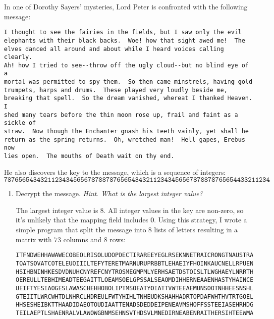 
\begin{problem}
In one of Dorothy Sayers' mysteries, Lord Peter is confronted with the following message:

\vspace{1ex}

\begin{verbatim}
I thought to see the fairies in the fields, but I saw only the evil
elephants with their black backs.  Woe! how that sight awed me!  The
elves danced all around and about while I heard voices calling clearly.
Ah! how I tried to see--throw off the ugly cloud--but no blind eye of a
mortal was permitted to spy them.  So then came minstrels, having gold
trumpets, harps and drums.  These played very loudly beside me,
breaking that spell.  So the dream vanished, whereat I thanked Heaven.  I
shed many tears before the thin moon rose up, frail and faint as a sickle of
straw.  Now though the Enchanter gnash his teeth vainly, yet shall he
return as the spring returns.  Oh, wretched man!  Hell gapes, Erebus now
lies open.  The mouths of Death wait on thy end.
\end{verbatim}
\vspace{1ex}

He also discovers the key to the message, which is a sequence of integers:
\[ 
\texttt{7876565434321123434565678788787656543432112343456567878878765654433211234}
\]

\begin{enumerate}\renewcommand{\itemsep}{3mm}
\item Decrypt the message. \emph{Hint. What is the largest integer value?}

\begin{Answer}
The largest integer value is $8$.
All integer values in the key are non-zero, so it's unlikely that the mapping field includes 0.
Using this strategy, I wrote a simple program that split the message into 8 lists of letters
resulting in a matrix with $73$ columns and $8$ rows: 

{
\color{blue}%
\begin{verbatim}
ITFNDWEHHAWAWECOBEOLRISOLUDOPDECTIRAREEYEGLRSEKNNETRAICRONGTNAUSTRAPSOOEO
TOATSOVATCOTELEUOIIILTEFYTERETMARNURUPRBBTLEHAEIYFHOINKAUCNELLRPUENENPUAN
HSIHBNINHKESDVDNUHCNYREFCNYTROSMEGMPMLYERHSAETDSTOISLTLWGHAEYLNRRTHSOETTT
OEREULLTEBHIMEADTEEGAITTLOEAMSOELGPSSALSEAOMDIHHERNEAAENHASTYHAINCEEWNHHH
UEIFTYESIAOGESLAWASCHEHHOBOLIPTMSOEATYOIATTVWTEEAEMUNSOOTNHHEESNSHLRLTSWY
GTEIITLWRCWHTDLNHRCLHDREULFWTYHIHLTNHEUDKSHAHHADRTOPDAFWHTHVTRTGOELEIHOAE
HHSESHEIBKTTHAADIDAEOTOUDIAATTENADSDEDDEIPENEAVMSHOFFSSTEEIASEHRHDGBEEFIN
TEILAEPTLSHAENRALVLAWOWGBNMSEHNSVTHDSVLMNEDIRNEABENRAITHERSIHTEEWMAUSMDTD
\end{verbatim}
}


\end{Answer}
\end{enumerate}
\end{problem}
